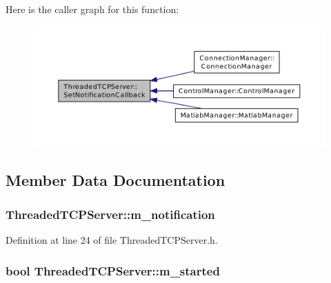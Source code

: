 Here is the caller graph for this function\-:\nopagebreak
\begin{figure}[H]
\begin{center}
\leavevmode
\includegraphics[width=350pt]{class_threaded_t_c_p_server_ac201656ab22b4ad07115d78cf8b7dd89_icgraph}
\end{center}
\end{figure}




\subsection{Member Data Documentation}
\hypertarget{class_threaded_t_c_p_server_acb1fa272e38dbd62673d5279a3e94345}{
\subsubsection[{m\-\_\-notification}]{ Threaded\-T\-C\-P\-Server\-::m\-\_\-notification\hspace{0.3cm}{\ttfamily [private]}}}\label{class_threaded_t_c_p_server_acb1fa272e38dbd62673d5279a3e94345}


Definition at line 24 of file Threaded\-T\-C\-P\-Server.\-h.

\hypertarget{class_threaded_t_c_p_server_aae68c31d87e830f67907edba35eceec3}{
\subsubsection[{m\-\_\-started}]{\setlength{\rightskip}{0pt plus 5cm}bool Threaded\-T\-C\-P\-Server\-::m\-\_\-started\hspace{0.3cm}{\ttfamily [private]}}}\label{class_threaded_t_c_p_server_aae68c31d87e830f67907edba35eceec3}


